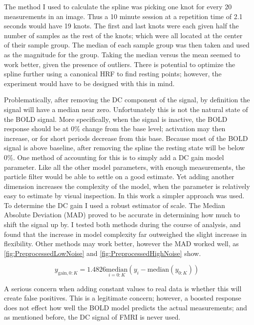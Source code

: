The method I used to calculate the spline was picking one knot for every 20
measurements in an image. Thus a 10 minute session at a repetition time of 
2.1 seconds would have 19 knots. The first and last knots were each 
given half the number of samples as the rest of the knots; which were all 
located at the center of their sample group. The median of each sample group
was then taken and used as the magnitude for the group. Taking the median 
versus the mean seemed to work better, given the presence of outliers. 
There is potential to optimize the spline further using a canonical 
HRF to find resting points; however, the experiment would have
to be designed with this in mind. 

Problematically, after removing the DC component of the signal,
by definition the signal will have a median near zero. 
Unfortunately this is not the natural state of the BOLD signal. More specifically,
when the signal is inactive, the BOLD response should be at 0\% change from
the base level; activation may then increase, or for short periods decrease from this base.
Because most of the BOLD signal is above baseline, after removing the spline
the resting state will be below 0\%.  
One method of accounting for this is to simply add a DC gain model parameter.
Like all the other model parameters, with enough measurements, the particle filter
would be able to settle on a good estimate. Yet adding another dimension increases the
complexity of the model, when the parameter is relatively easy to estimate
by visual inspection.  In this work a simpler approach was used. To determine
the DC gain I used a robust estimator of scale. The Median Absolute Deviation (MAD)
proved to be accurate in determining how much to shift the signal up
by. I tested both methods during the course of analysis, and found that the increase 
in model complexity far outweighed the slight increase in flexibility. Other
methods may work better, however the MAD worked well, 
as \autoref{fig:PreprocessedLowNoise} and \autoref{fig:PreprocessedHighNoise} show. 

\begin{equation}
y_{\text{gain}, 0:K} = 1.4826\underset{i=0:K}{\text{median}}(y_i - \text{median}(y_{0:K}))
\label{eq:mad}
\end{equation}

A serious concern when adding constant values to 
real data is whether this will create false positives. This is a legitimate
concern; however, a boosted response does not effect how well the BOLD model 
predicts the actual measurements; and as mentioned before, the DC signal of FMRI
is never used. 

